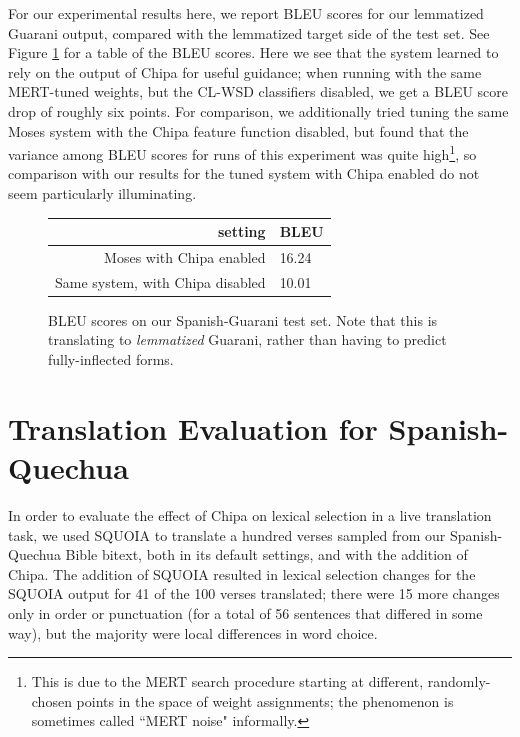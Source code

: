 For our experimental results here, we report BLEU scores for our lemmatized
Guarani output, compared with the lemmatized target side of the test set.
See Figure \ref{fig:bleu-es-gn} for a table of the BLEU scores.
Here we see that the system learned to rely on the output of Chipa for useful
guidance; when running with the same MERT-tuned weights, but the CL-WSD
classifiers disabled, we get a BLEU score drop of roughly six points. For
comparison, we additionally tried tuning the same Moses system with the Chipa
feature function disabled, but found that the variance among BLEU scores for
runs of this experiment was quite high\footnote{This is due to the MERT search
procedure starting at different, randomly-chosen points in the space of weight
assignments; the phenomenon is sometimes called ``MERT noise" informally.}, so
comparison with our results for the tuned system with Chipa enabled do not seem
particularly illuminating.

\begin{figure}
  \begin{centering}
  \begin{tabulary}{\textwidth}{|R|L|}
    \hline
    setting & BLEU \\
    \hline
    Moses with Chipa enabled &  16.24 \\
    \hline
    Same system, with Chipa disabled &  10.01 \\
    \hline
  \end{tabulary}
  \end{centering}
  \caption{BLEU scores on our Spanish-Guarani test set. Note that this is
  translating to \emph{lemmatized} Guarani, rather than having to predict
  fully-inflected forms.}
  \label{fig:bleu-es-gn}
\end{figure}


\section{Translation Evaluation for Spanish-Quechua}
\label{sec:integration-es-qu-evaluation}
In order to evaluate the effect of Chipa on lexical selection in a live
translation task, we used SQUOIA to translate a hundred verses sampled from our
Spanish-Quechua Bible bitext, both in its default settings, and with the
addition of Chipa. The addition of SQUOIA resulted in lexical selection changes
for the SQUOIA output for 41 of the 100 verses translated; there were 15 more
changes only in order or punctuation (for a total of 56 sentences that differed
in some way), but the majority were local differences in word choice.


